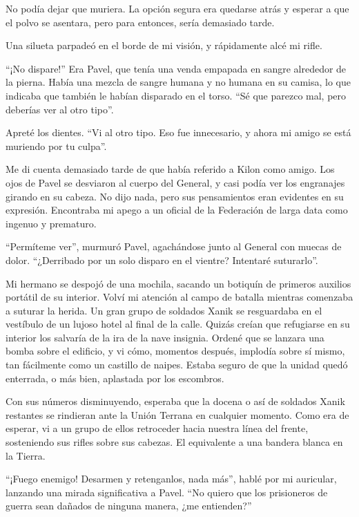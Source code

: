 \documentclass[spanish,12pt,a4paper,oneside,titlepage]{book}
\begin{document}
    No podía dejar que muriera. La opción segura era quedarse atrás y esperar a que el polvo se asentara, pero para entonces, sería demasiado tarde.

    Una silueta parpadeó en el borde de mi visión, y rápidamente alcé mi rifle.

    ``¡No dispare!'' Era Pavel, que tenía una venda empapada en sangre alrededor de la pierna. Había una mezcla de sangre humana y no humana en su camisa, lo que indicaba que también le habían disparado en el torso. ``Sé que parezco mal, pero deberías ver al otro tipo''.

    Apreté los dientes. ``Vi al otro tipo. Eso fue innecesario, y ahora mi amigo se está muriendo por tu culpa''.

    Me di cuenta demasiado tarde de que había referido a Kilon como amigo. Los ojos de Pavel se desviaron al cuerpo del General, y casi podía ver los engranajes girando en su cabeza. No dijo nada, pero sus pensamientos eran evidentes en su expresión. Encontraba mi apego a un oficial de la Federación de larga data como ingenuo y prematuro.

    ``Permíteme ver'', murmuró Pavel, agachándose junto al General con muecas de dolor. ``¿Derribado por un solo disparo en el vientre? Intentaré suturarlo''.

    Mi hermano se despojó de una mochila, sacando un botiquín de primeros auxilios portátil de su interior. Volví mi atención al campo de batalla mientras comenzaba a suturar la herida. Un gran grupo de soldados Xanik se resguardaba en el vestíbulo de un lujoso hotel al final de la calle. Quizás creían que refugiarse en su interior los salvaría de la ira de la nave insignia. Ordené que se lanzara una bomba sobre el edificio, y vi cómo, momentos después, implodía sobre sí mismo, tan fácilmente como un castillo de naipes. Estaba seguro de que la unidad quedó enterrada, o más bien, aplastada por los escombros.

    Con sus números disminuyendo, esperaba que la docena o así de soldados Xanik restantes se rindieran ante la Unión Terrana en cualquier momento. Como era de esperar, vi a un grupo de ellos retroceder hacia nuestra línea del frente, sosteniendo sus rifles sobre sus cabezas. El equivalente a una bandera blanca en la Tierra.

    ``¡Fuego enemigo! Desarmen y retenganlos, nada más'', hablé por mi auricular, lanzando una mirada significativa a Pavel. ``No quiero que los prisioneros de guerra sean dañados de ninguna manera, ¿me entienden?''
\end{document}
